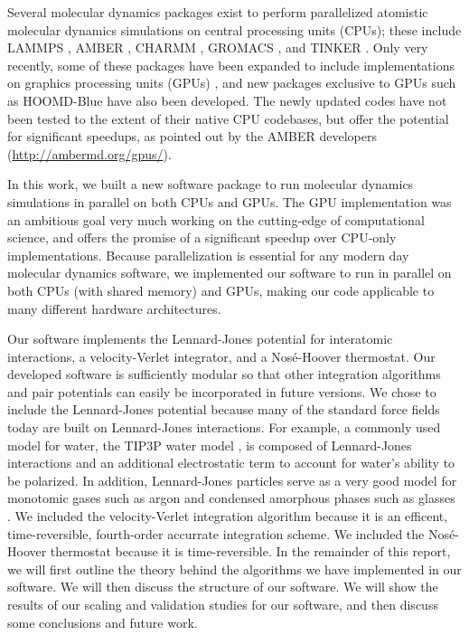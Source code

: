 \documentclass[12pt]{article}
\begin{document}
Several molecular dynamics packages exist to perform parallelized atomistic molecular dynamics simulations on central processing units (CPUs); these include LAMMPS \cite{Plimpton1995}, AMBER \cite{Case2010}, CHARMM \cite{MacKerell1998}, GROMACS \cite{Scott1999}, and TINKER \cite{Ponder2003}.
%
Only very recently, some of these packages have been expanded to include implementations on graphics processing units (GPUs) \cite{Brown2012,Brown2011,Gotz2012,Salomon-Ferrer2013}, and new packages exclusive to GPUs such as HOOMD-Blue\cite{Anderson2008} have also been developed. 
%
The newly updated codes have not been tested to the extent of their native CPU codebases, but offer the potential for significant speedups, as pointed out by the AMBER developers (\url{http://ambermd.org/gpus/}).

In this work, we built a new software package to run molecular dynamics simulations in parallel on both CPUs and GPUs. 
%
The GPU implementation was an ambitious goal very much working on the cutting-edge of computational science, 
and offers the promise of a significant speedup over CPU-only implementations.
%
Because parallelization is essential for any modern day molecular dynamics software, we implemented our software to run in parallel on both CPUs (with shared memory) and GPUs, 
making our code applicable to many different hardware architectures.

Our software implements the Lennard-Jones potential for interatomic interactions, a velocity-Verlet integrator, and a Nos\'{e}-Hoover thermostat. 
%
Our developed software is sufficiently modular so that other integration algorithms and pair potentials can easily be incorporated in future versions.
%
We chose to include the Lennard-Jones potential because many of the standard force fields \cite{Case2010,MacKerell1998,Scott1999,Kaminski2001,Arnautova2006,Khoury2013} today are built on Lennard-Jones interactions.
%
For example, a commonly used model for water, the TIP3P water model \cite{Jorgensen1983}, is composed of Lennard-Jones interactions and an additional electrostatic term to account for water's ability to be polarized.
%
In addition, Lennard-Jones particles serve as a very good model for monotomic gases such as argon \cite{Rahman1964} and condensed amorphous phases such as glasses \cite{Debenedetti2001}.
%
We included the velocity-Verlet integration algorithm because it is an efficent, time-reversible, fourth-order accurrate integration scheme. 
%
We included the Nos\'{e}-Hoover thermostat because it is time-reversible.
%
In the remainder of this report, we will first outline the theory behind the algorithms we have implemented in our software.
%
We will then discuss the structure of our software.
%
We will show the results of our scaling and validation studies for our software, and then discuss some conclusions and future work.  
\end{document}
